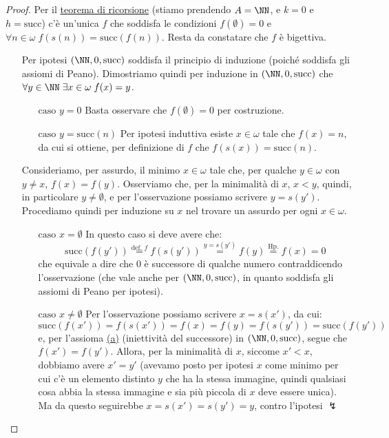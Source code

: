 \documentclass[11pt]{scrartcl}
\begin{document}
\begin{proof}
	Per il \hyperref[ric1]{teorema di ricorsione} (stiamo prendendo $A = \NN$, e $k = 0$ e $h = \text{succ}$) c'è un'unica $f$ che soddisfa le condizioni $f(\emptyset) = 0$ e $\forall n \in \omega \; f(s(n)) = \text{succ}(f(n))$.
	Resta da constatare che $f$ è bigettiva.
	\begin{itemize}
		\item[\boxed{\text{Surgettività}}] Per ipotesi $(\NN, 0, \text{succ})$ soddisfa il principio di induzione (poiché soddisfa gli assiomi di Peano). Dimostriamo quindi per induzione in $(\NN, 0, \text{succ})$ che $\forall y \in \NN \; \exists x \in \omega \; f(x) = y$.
		\begin{itemize}
			\item[$\boxed{\text{caso $y = 0$}}$] Basta osservare che $f(\emptyset) = 0$ per costruzione.
			\item[$\boxed{\text{caso $y = \text{succ}(n)$}}$] Per ipotesi induttiva esiste $x \in \omega$ tale che $f(x) = n$, da cui si ottiene, per definizione di $f$ che $f(s(x)) = \text{succ}(n)$.
		\end{itemize}
		\item[\boxed{\text{Iniettività}}] Consideriamo, per assurdo, il minimo $x \in \omega$ tale che, per qualche $y \in \omega$ con $y \ne x$, $f(x) = f(y)$.
		Osserviamo che, per la minimalità di $x$, $x<y$, quindi, in particolare $y \ne \emptyset$, e per l'osservazione possiamo scrivere $y = s(y')$. Procediamo quindi per induzione su $x$
		nel trovare un assurdo per ogni $x \in \omega$.
		\begin{itemize}
			\item[$\boxed{\text{caso $x = \emptyset$}}$] In questo caso si deve avere che:
			\[
				\text{succ}(f(y')) \overset{\text{def. $f$}}{=} f(s(y'))
								   \overset{y = s(y')}{=} f(y)
								   \overset{\text{Hp.}}{=} f(x) = 0
				\]
			che equivale a dire che 0 è successore di qualche numero contraddicendo l'osservazione (che vale anche per $(\NN, 0, \text{succ})$, in quanto soddisfa gli assiomi di Peano per ipotesi).
			\item[$\boxed{\text{caso $x \ne \emptyset$}}$] Per l'osservazione possiamo scrivere $x = s(x')$, da cui:
			\[ \text{succ}(f(x')) = f(s(x')) = f(x) = f(y) = f(s(y')) = \text{succ}(f(y'))
				\]
			e, per l'assioma \hyperref[a]{(a)} (iniettività del successore) in $(\NN, 0, \text{succ})$, segue che $f(x') = f(y')$. Allora, per la minimalità di $x$, siccome $x' < x$, dobbiamo avere $x' = y'$ (avevamo posto per ipotesi $x$ come minimo per cui c'è un elemento distinto $y$ che
			ha la stessa immagine, quindi qualsiasi cosa abbia la stessa immagine e sia più piccola di $x$ deve essere unica).
			Ma da questo seguirebbe $x = s(x') = s(y') = y$, contro l'ipotesi $\lightning$
		\end{itemize}
	\end{itemize}
\end{proof}
\end{document}
